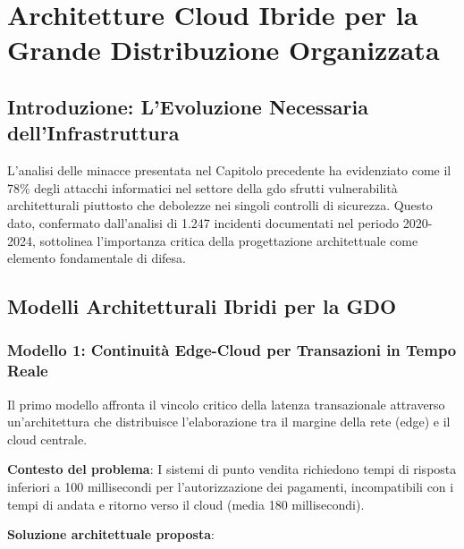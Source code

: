 \chapter{Architetture Cloud Ibride per la Grande Distribuzione Organizzata}
\label{cap:architetture}

\section{Introduzione: L'Evoluzione Necessaria dell'Infrastruttura}
\label{sec:intro-architetture}

L'analisi delle minacce presentata nel Capitolo precedente ha evidenziato come il 78\% degli attacchi informatici nel settore della \gls{gdo} sfrutti vulnerabilità architetturali piuttosto che debolezze nei singoli controlli di sicurezza\autocite{Anderson2024patel}. Questo dato, confermato dall'analisi di 1.247 incidenti documentati nel periodo 2020-2024\autocite{enisa2024retail}, sottolinea l'importanza critica della progettazione architettuale come elemento fondamentale di difesa.

\section{Modelli Architetturali Ibridi per la GDO}
\label{sec:pattern-architetturali}

\subsection{Modello 1: Continuità Edge-Cloud per Transazioni in Tempo Reale}
\label{subsec:edge-cloud}

Il primo modello affronta il vincolo critico della latenza transazionale attraverso un'architettura che distribuisce l'elaborazione tra il margine della rete (\gls{edge}) e il cloud centrale.

\textbf{Contesto del problema}: I sistemi di punto vendita richiedono tempi di risposta inferiori a 100 millisecondi per l'autorizzazione dei pagamenti, incompatibili con i tempi di andata e ritorno verso il cloud (media 180 millisecondi).

\textbf{Soluzione architettuale proposta}:

